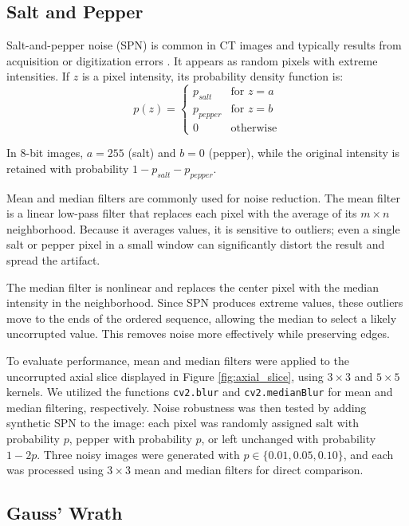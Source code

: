 \documentclass[10pt, twocolumn]{article}
\begin{document}
\subsection{Salt and Pepper}
Salt-and-pepper noise (SPN) is common in CT images and typically results from acquisition or digitization errors \cite{alrabaieMultipleNoisesRemoval2018}. It appears as random pixels with extreme intensities. If $z$ is a pixel intensity, its probability density function is:
\begin{equation}
p(z) = 
\begin{cases} 
p_{salt} & \text{for } z = a \\
p_{pepper} & \text{for } z = b \\
0 & \text{otherwise}
\end{cases}
\end{equation}

In 8-bit images, $a = 255$ (salt) and $b = 0$ (pepper), while the original intensity is retained with probability $1 - p_{salt} - p_{pepper}$.

Mean and median filters are commonly used for noise reduction. The mean filter is a linear low-pass filter that replaces each pixel with the average of its $m \times n$ neighborhood. Because it averages values, it is sensitive to outliers; even a single salt or pepper pixel in a small window can significantly distort the result and spread the artifact.

The median filter is nonlinear and replaces the center pixel with the median intensity in the neighborhood. Since SPN produces extreme values, these outliers move to the ends of the ordered sequence, allowing the median to select a likely uncorrupted value. This removes noise more effectively while preserving edges.

To evaluate performance, mean and median filters were applied to the uncorrupted axial slice displayed in Figure \ref{fig:axial_slice}, using $3 \times 3$ and $5 \times 5$ kernels. We utilized the functions \texttt{cv2.blur} and \texttt{cv2.medianBlur} for mean and median filtering, respectively. Noise robustness was then tested by adding synthetic SPN to the image: each pixel was randomly assigned salt with probability $p$, pepper with probability $p$, or left unchanged with probability $1 - 2p$. Three noisy images were generated with $p \in \{0.01, 0.05, 0.10\}$, and each was processed using $3 \times 3$ mean and median filters for direct comparison.

\subsection{Gauss' Wrath}
\end{document}
